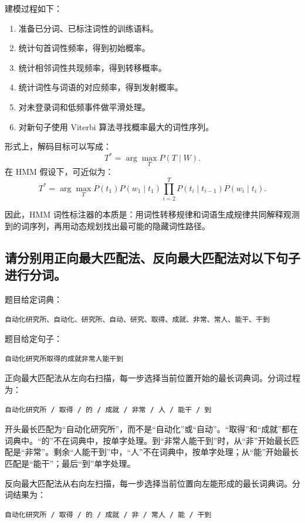 建模过程如下：
\begin{enumerate}
  \item 准备已分词、已标注词性的训练语料。
  \item 统计句首词性频率，得到初始概率。
  \item 统计相邻词性共现频率，得到转移概率。
  \item 统计词性与词语的对应频率，得到发射概率。
  \item 对未登录词和低频事件做平滑处理。
  \item 对新句子使用 Viterbi 算法寻找概率最大的词性序列。
\end{enumerate}

形式上，解码目标可以写成：
\[
  T^*=\arg\max_T P(T\mid W).
\]
在 HMM 假设下，可近似为：
\[
  T^*=\arg\max_T P(t_1)P(w_1\mid t_1)
  \prod_{i=2}^{T} P(t_i\mid t_{i-1})P(w_i\mid t_i).
\]

因此，HMM 词性标注器的本质是：用词性转移规律和词语生成规律共同解释观测到的词序列，再用动态规划找出最可能的隐藏词性路径。

\subsection{请分别用正向最大匹配法、反向最大匹配法对以下句子进行分词。}

题目给定词典：
\begin{verbatim}
自动化研究所、自动化、研究所、自动、研究、取得、成就、非常、常人、能干、干到
\end{verbatim}

题目给定句子：
\begin{verbatim}
自动化研究所取得的成就非常人能干到
\end{verbatim}

正向最大匹配法从左向右扫描，每一步选择当前位置开始的最长词典词。分词过程为：
\begin{verbatim}
自动化研究所 / 取得 / 的 / 成就 / 非常 / 人 / 能干 / 到
\end{verbatim}

开头最长匹配为“自动化研究所”，而不是“自动化”或“自动”。“取得”和“成就”都在词典中。“的”不在词典中，按单字处理。到“非常人能干到”时，从“非”开始最长匹配是“非常”。剩余“人能干到”中，“人”不在词典中，按单字处理；从“能”开始最长匹配是“能干”；最后“到”单字处理。

反向最大匹配法从右向左扫描，每一步选择当前位置向左能形成的最长词典词。分词结果为：
\begin{verbatim}
自动化研究所 / 取得 / 的 / 成就 / 非 / 常人 / 能 / 干到
\end{verbatim}

